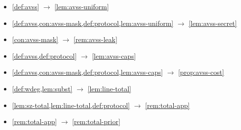 \begin{itemize}
\item \cref{def:avss} $\to$ \cref{lem:avss-uniform}
\item \cref{def:avss,con:avss-mask,def:protocol,lem:avss-uniform} $\to$ \cref{lem:avss-secret}
\item \cref{con:avss-mask} $\to$ \cref{rem:avss-leak}
\item \cref{def:avss,def:protocol} $\to$ \cref{lem:avss-caps}
\item \cref{def:avss,con:avss-mask,def:protocol,lem:avss-caps} $\to$ \cref{prop:avss-cost}
\item \cref{def:wdeg,lem:subst} $\to$ \cref{lem:line-total}
\item \cref{lem:sz-total,lem:line-total,def:protocol} $\to$ \cref{rem:total-app}
\item \cref{rem:total-app} $\to$ \cref{rem:total-prior}
\end{itemize}
